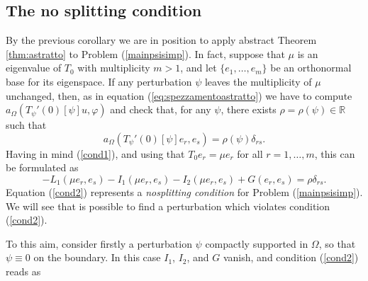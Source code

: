 \documentclass[a4paper,reqno,11pt,oneside]{amsart}
\theoremstyle{plain}
\theoremstyle{plain}
\theoremstyle{plain}
\theoremstyle{remark}
\begin{document}
\subsection{The no splitting condition}
By the previous corollary we are in position to apply abstract Theorem \ref{thm:astratto} to Problem (\ref{mainpsisimp}). In fact, suppose that $\mu $ is an eigenvalue of $T_0$ with multiplicity $m>1$, and let $\{e_1, \dots,e_m \}$ be an orthonormal base for its eigenspace. If any perturbation $\psi$ leaves the multiplicity of $\mu$ unchanged, then, as in equation (\ref{eq:spezzamentoastratto}) we have to compute $   a_\Omega  (T_\psi '(0)[\psi] u,\varphi)$ and check that, for any $\psi$, there exists $\rho=\rho(\psi)\in \mathbb{R}$ such that
\begin{equation}
       a_\Omega  (T_\psi '(0)[\psi] e_r,e_s)=  \rho(\psi)\delta_{rs}.
\end{equation}
Having in mind (\ref{cond1}), and using that $T_0e_r=\mu e_r$ for all $r=1,\dots,m$, 
this can be formulated as
\begin{equation}
    \label{cond2}
    -L_1(\mu e_r,e_s)-
I_1(\mu  e_r,e_s)
-I_2(\mu  e_r, e_s)+G( e_r,e_s)=\rho\delta_{rs}.
\end{equation}
Equation (\ref{cond2}) represents a {\em nosplitting condition} for Problem  (\ref{mainpsisimp}). We will see that is possible to find a perturbation which violates condition  (\ref{cond2}).

To this aim, consider firstly a perturbation $\psi$ compactly supported in $\Omega$, so that $\psi\equiv0$ on the boundary.  In this case $I_1$, $I_2$, and $G$ vanish, and condition (\ref{cond2}) reads as
\end{document}
